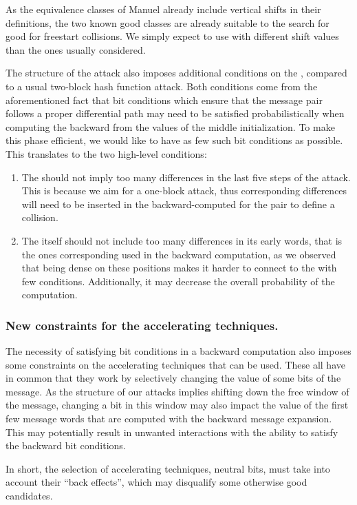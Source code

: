 As the equivalence classes of Manuel already include vertical shifts in their definitions, the two known good classes are already suitable to the search for good \dvs for freestart collisions.
We simply expect to use \dvs with different shift values than the ones usually considered.

\medskip

The structure of the attack also imposes additional conditions on the \dv, compared to a usual two-block hash function attack. Both conditions come from the aforementioned fact that bit conditions
which ensure that the message pair follows a proper differential path
may need to be satisfied probabilistically when computing the \iv backward from the values of the middle initialization. To make this phase efficient, we would like to have as few such
bit conditions as possible. This translates to the two high-level conditions:
\begin{enumerate}
\item The \dv should not imply too many differences in the last five steps of the attack. This is because we aim for a one-block attack, thus corresponding differences will need to be inserted in the
backward-computed \iv for the pair to define a collision.
\item The \dv itself should not include too many differences in its early words, that is the ones corresponding used in the backward computation, as we observed that being dense on these positions makes
it harder to connect to the \iv with few conditions. Additionally, it may decrease the overall probability of the computation.
\end{enumerate}

\subsubsection{New constraints for the accelerating techniques.}
The necessity of satisfying bit conditions in a backward computation also imposes some constraints on the accelerating techniques that can be used. These all have in common that they work by
selectively changing the value of some bits of the message. As the structure of our attacks implies shifting down the free window of the message, changing a bit in this window may also impact
the value of the first few message words that are computed with the backward message expansion. This may potentially result in unwanted interactions with the ability to satisfy the backward bit conditions.

In short, the selection of accelerating techniques, \eg neutral bits, must take into account their ``back effects'', which may disqualify some otherwise good candidates.

